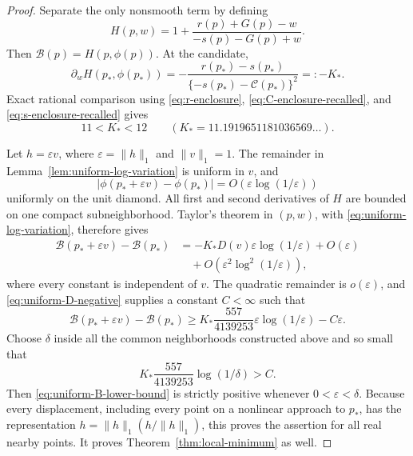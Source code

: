 \documentclass[11pt,reqno,letterpaper]{amsart}
\numberwithin{equation}{section}
\theoremstyle{definition}
\theoremstyle{remark}
\begin{document}
\begin{proof}
Separate the only nonsmooth term by defining
\begin{equation}\label{eq:local-H-definition}
 H(p,w)=1+\frac{r(p)+G(p)-w}{-s(p)-G(p)+w}.
\end{equation}
Then \(\mathcal B(p)=H(p,\phi(p))\).  At the candidate,
\begin{equation}\label{eq:local-K-star}
 \partial_wH(p_*,\phi(p_*))
 =-\frac{r(p_*)-s(p_*)}
         {\{-s(p_*)-\mathcal C(p_*)\}^2}
 =:-K_*.
\end{equation}
Exact rational comparison using \eqref{eq:r-enclosure},
\eqref{eq:C-enclosure-recalled}, and \eqref{eq:s-enclosure-recalled}
gives
\begin{equation}\label{eq:local-K-star-bounds}
 11<K_*<12
 \qquad(K_*=11.1919651181036569\ldots).
\end{equation}

Let \(h=\varepsilon v\), where
\(\varepsilon=\|h\|_1\) and \(\|v\|_1=1\).  The remainder in
Lemma~\ref{lem:uniform-log-variation} is uniform in \(v\), and
\[
 |\phi(p_*+\varepsilon v)-\phi(p_*)|
 =O(\varepsilon\log(1/\varepsilon))
\]
uniformly on the unit diamond.  All first and second derivatives of \(H\)
are bounded on one compact subneighborhood.  Taylor's theorem in
\((p,w)\), with \eqref{eq:uniform-log-variation}, therefore gives
\begin{equation}\label{eq:uniform-B-Taylor}
 \begin{split}
 \mathcal B(p_*+\varepsilon v)-\mathcal B(p_*)
 &=-K_*D(v)\varepsilon\log(1/\varepsilon)+O(\varepsilon)\\
 &\quad+O(\varepsilon^2\log^2(1/\varepsilon)),
 \end{split}
\end{equation}
where every constant is independent of \(v\).  The quadratic remainder
is \(o(\varepsilon)\), and \eqref{eq:uniform-D-negative} supplies a
constant \(C<\infty\) such that
\begin{equation}\label{eq:uniform-B-lower-bound}
 \mathcal B(p_*+\varepsilon v)-\mathcal B(p_*)
 \geq K_*\frac{557}{4139253}
       \varepsilon\log(1/\varepsilon)-C\varepsilon.
\end{equation}
Choose \(\delta\) inside all the common neighborhoods constructed above
and so small that
\[
 K_*\frac{557}{4139253}\log(1/\delta)>C.
\]
Then \eqref{eq:uniform-B-lower-bound} is strictly positive whenever
\(0<\varepsilon<\delta\).  Because every displacement, including every
point on a nonlinear approach to \(p_*\), has the representation
\(h=\|h\|_1(h/\|h\|_1)\), this proves the assertion for all real nearby
points.  It proves Theorem~\ref{thm:local-minimum} as well.
\end{proof}
\end{document}
